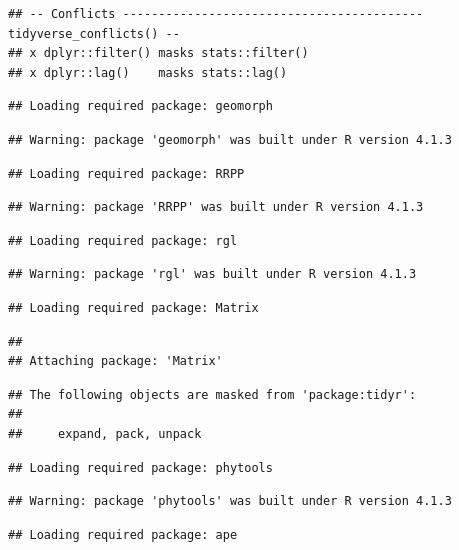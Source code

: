 \documentclass[
]{book}
\theoremstyle{definition}
\theoremstyle{definition}
\theoremstyle{definition}
\theoremstyle{definition}
\theoremstyle{remark}
\begin{document}
\begin{verbatim}
## -- Conflicts ------------------------------------------ tidyverse_conflicts() --
## x dplyr::filter() masks stats::filter()
## x dplyr::lag()    masks stats::lag()
\end{verbatim}

\begin{verbatim}
## Loading required package: geomorph
\end{verbatim}

\begin{verbatim}
## Warning: package 'geomorph' was built under R version 4.1.3
\end{verbatim}

\begin{verbatim}
## Loading required package: RRPP
\end{verbatim}

\begin{verbatim}
## Warning: package 'RRPP' was built under R version 4.1.3
\end{verbatim}

\begin{verbatim}
## Loading required package: rgl
\end{verbatim}

\begin{verbatim}
## Warning: package 'rgl' was built under R version 4.1.3
\end{verbatim}

\begin{verbatim}
## Loading required package: Matrix
\end{verbatim}

\begin{verbatim}
## 
## Attaching package: 'Matrix'
\end{verbatim}

\begin{verbatim}
## The following objects are masked from 'package:tidyr':
## 
##     expand, pack, unpack
\end{verbatim}

\begin{verbatim}
## Loading required package: phytools
\end{verbatim}

\begin{verbatim}
## Warning: package 'phytools' was built under R version 4.1.3
\end{verbatim}

\begin{verbatim}
## Loading required package: ape
\end{verbatim}
\end{document}
